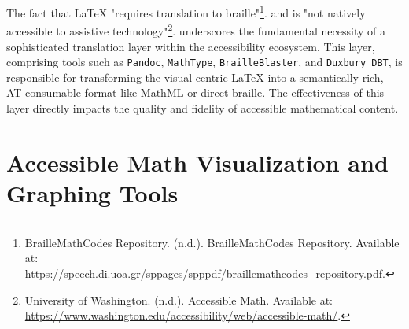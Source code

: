 The fact that LaTeX "requires translation to braille"\footnote{BrailleMathCodes Repository. (n.d.). BrailleMathCodes Repository. Available at: \url{https://speech.di.uoa.gr/sppages/spppdf/braillemathcodes_repository.pdf}.}. and is "not natively accessible to assistive technology"\footnote{University of Washington. (n.d.). Accessible Math. Available at: \url{https://www.washington.edu/accessibility/web/accessible-math/}.}. underscores the fundamental necessity of a sophisticated translation layer within the accessibility ecosystem. This layer, comprising tools such as \texttt{Pandoc}, \texttt{MathType}, \texttt{BrailleBlaster}, and \texttt{Duxbury DBT}, is responsible for transforming the visual-centric LaTeX into a semantically rich, AT-consumable format like MathML or direct braille. The effectiveness of this layer directly impacts the quality and fidelity of accessible mathematical content.

\section{Accessible Math Visualization and Graphing Tools}\label{sec:math-visualization}
